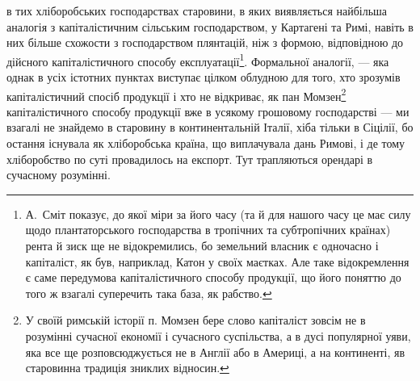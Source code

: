 \parcont{}  %
в тих хліборобських господарствах старовини, в яких виявляється найбільша
аналогія з капіталістичним сільським господарством, у Картагені та Римі,
навіть в них більше схожости з господарством плянтацій, ніж з формою, відповідною
до дійсного капіталістичного способу експлуатації\footnote{
А.~Сміт показує, до якої міри за його часу (та й для нашого часу це має силу щодо
плантаторського господарства в тропічних та субтропічних країнах) рента й зиск ще не відокремились,
бо земельний власник є одночасно і капіталіст, як був, наприклад, Катон у своїх маєтках. Але таке
відокремлення є саме передумова капіталістичного способу продукції, що його поняттю до того ж
взагалі суперечить така база, як рабство.
}. Формальної аналогії,
— яка однак в усіх істотних пунктах виступає цілком облудною для того,
хто зрозумів капіталістичний спосіб продукції і хто не відкриває, як пан Момзен\footnote{
У своїй римській історії п. Момзен бере слово капіталіст зовсім не в розумінні сучасної економії
і сучасного суспільства, а в дусі популярної уяви, яка все ще розповсюджується не в Англії або в
Америці, а на континенті, яв старовинна традиція зниклих відносин.
}
капіталістичного способу продукції вже в усякому грошовому господарстві —
ми взагалі не знайдемо в старовину в континентальній Італії, хіба тільки в Сіцілії,
бо остання існувала як хліборобська країна, що виплачувала дань Римові,
і де тому хліборобство по суті провадилось на експорт. Тут трапляються орендарі
в сучасному розумінні.


